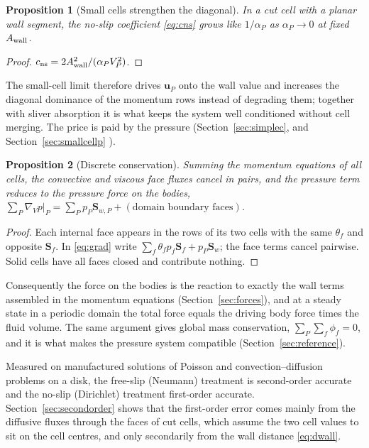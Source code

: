 \documentclass[11pt,a4paper]{article}
\newtheorem{proposition}{Proposition}
\theoremstyle{remark}
\newcommand{\uu}{\bm{u}}
\newcommand{\Sf}{\bm{S}_f}
\newcommand{\Sw}{\bm{S}_w}
\newcommand{\Aw}{A_{\rm wall}}
\newcommand{\cns}{c_{\rm ns}}
\newcommand{\gradV}{\nabla_{\!V}}
\begin{document}
\begin{proposition}[Small cells strengthen the diagonal]
\label{prop:smallcell}
In a cut cell with a planar wall segment, the no-slip coefficient \eqref{eq:cns} grows like
$1/\alpha_P$ as $\alpha_P\to0$ at fixed $\Aw$.
\end{proposition}
\begin{proof}
$\cns=2\Aw^2/(\alpha_PV_P^2)$.
\end{proof}
The small-cell limit therefore drives $\uu_P$ onto the wall value and increases the
diagonal dominance of the momentum rows instead of degrading them; together with sliver
absorption it is what keeps the system well conditioned without cell merging. The price is
paid by the pressure (Section~\ref{sec:simplec}, and
Section~\ref{sec:smallcellp}%
).

\begin{proposition}[Discrete conservation]
\label{prop:conservation}
Summing the momentum equations of all cells, the convective and viscous face fluxes cancel in
pairs, and the pressure term reduces to the pressure force on the bodies,
$\sum_P\gradV p|_P=\sum_P p_P\bm S_{w,P}+(\text{domain boundary faces})$.
\end{proposition}
\begin{proof}
Each internal face appears in the rows of its two cells with the same $\theta_f$ and opposite
$\Sf$. In \eqref{eq:grad} write $\sum_f\theta_fp_f\Sf+p_P\Sw$; the face terms cancel pairwise.
Solid cells have all faces closed and contribute nothing.
\end{proof}

Consequently the force on the bodies is the reaction to exactly the wall terms assembled in the
momentum equations (Section~\ref{sec:forces}), and at a steady state in a periodic domain the
total force equals the driving body force times the fluid volume. The same argument gives
global mass conservation, $\sum_P\sum_f\phi_f=0$, and it is what makes the pressure system
compatible (Section~\ref{sec:reference}).

Measured on manufactured solutions of Poisson and convection--diffusion problems on a disk,
the free-slip (Neumann) treatment is second-order accurate and the no-slip (Dirichlet)
treatment first-order accurate.
Section~\ref{sec:secondorder} shows that the first-order error comes mainly from the
diffusive fluxes through the faces of cut cells, which assume the two cell values to sit on the
cell centres, and only secondarily from the wall distance \eqref{eq:dwall}.
\end{document}
